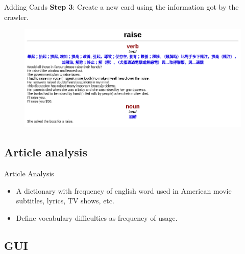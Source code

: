 \documentclass{beamer}
\begin{document}
\begin{frame}{Adding Cards}
	\textbf{Step 3}: Create a new card using the information got by the crawler.
	\begin{figure}[h]
			\centering
			\includegraphics[width=1.0\linewidth]{./card_sample.png}
	\end{figure}
\end{frame}

\subsection{Article analysis}%

\begin{frame}{Article Analysis}
	\begin{itemize}
		\item A dictionary with frequency of english word used in American movie
			subtitles, lyrics, TV shows, etc.
		\item Define vocabulary difficulties as frequency of usage.
	\end{itemize}
\end{frame}

\subsection{GUI}%
\end{document}
